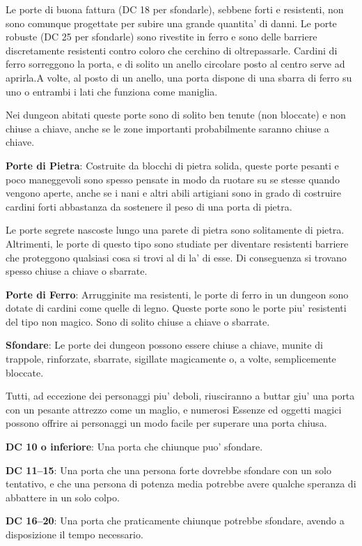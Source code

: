 \documentclass[a4paper,11pt,twoside,openany]{book}
\begin{document}
Le porte di buona fattura (DC 18 per sfondarle), sebbene forti e resistenti, non sono comunque progettate per subire una grande quantita' di danni. Le porte robuste (DC 25 per sfondarle) sono rivestite in ferro e sono delle barriere discretamente resistenti contro coloro che cerchino di oltrepassarle. Cardini di ferro sorreggono la porta, e di solito un anello circolare posto al centro serve ad aprirla.A volte, al posto di un anello, una porta dispone di una sbarra di ferro su uno o entrambi i lati che funziona come maniglia.

Nei dungeon abitati queste porte sono di solito ben tenute (non bloccate) e non chiuse a chiave, anche se le zone importanti probabilmente saranno chiuse a chiave.

\textbf{Porte di Pietra}: Costruite da blocchi di pietra solida, queste porte pesanti e poco maneggevoli sono spesso pensate in modo da ruotare su se stesse quando vengono aperte, anche se i nani e altri abili artigiani sono in grado di costruire cardini forti abbastanza da sostenere il peso di una porta di pietra.

Le porte segrete nascoste lungo una parete di pietra sono solitamente di pietra. Altrimenti, le porte di questo tipo sono studiate per diventare resistenti barriere che proteggono qualsiasi cosa si trovi al di la' di esse. Di conseguenza si trovano spesso chiuse a chiave o sbarrate.

\textbf{Porte di Ferro}: Arrugginite ma resistenti, le porte di ferro in un dungeon sono dotate di cardini come quelle di legno. Queste porte sono le porte piu' resistenti del tipo non magico. Sono di solito chiuse a chiave o sbarrate.

\textbf{Sfondare}: Le porte dei dungeon possono essere chiuse a chiave, munite di trappole, rinforzate, sbarrate, sigillate magicamente o, a volte, semplicemente bloccate.

Tutti, ad eccezione dei personaggi piu' deboli, riusciranno a buttar giu' una porta con un pesante attrezzo come un maglio, e numerosi Essenze ed oggetti magici possono offrire ai personaggi un modo facile per superare una porta chiusa.

\textbf{DC 10 o inferiore}: Una porta che chiunque puo' sfondare.

\textbf{DC 11--15}: Una porta che una persona forte dovrebbe sfondare con un solo tentativo, e che una persona di potenza media potrebbe avere qualche speranza di abbattere in un solo colpo.

\textbf{DC 16--20}: Una porta che praticamente chiunque potrebbe sfondare, avendo a disposizione il tempo necessario. 
\end{document}
